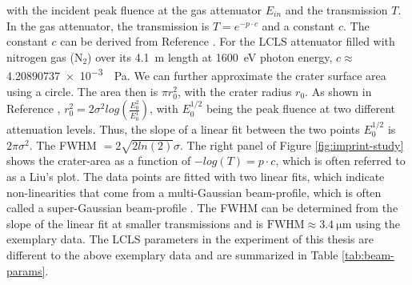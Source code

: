 with the incident peak fluence at the gas attenuator $E_{in}$ and the transmission $T$. In the gas attenuator, the transmission is $T=e^{-p \cdot c}$ and a constant $c$. The constant $c$ can be derived from Reference \citep{Henke-1993-ADNDT}. For the LCLS attenuator filled with nitrogen gas (N$_{2}$) over its \SI{4.1}{\meter} length at \SI{1600}{\electronvolt} photon energy, $c\approx$ \SI{4.20890737e-3}{\per\pascal}. We can further approximate the crater surface area using a circle. The area then is $\pi r_{0}^{2}$, with the crater radius $r_{0}$. As shown in Reference \citep{Liu-1982-OptLett}, $r_{0}^{2}=2\sigma^{2}log(\tfrac{E^{2}_{0}}{E_{0}^{1}})$, with $E_{0}^{1/2}$ being the peak fluence at two different attenuation levels. Thus, the slope of a linear fit between the two points $E_{0}^{1/2}$ is $2 \pi \sigma^{2}$. The FWHM $=2\sqrt{2 ln(2)}\sigma$. The right panel of Figure \ref{fig:imprint-study} shows the crater-area as a function of $-log(T)= p \cdot c$, which is often referred to as a Liu's plot. The data points are fitted with two linear fits, which indicate non-linearities that come from a multi-Gaussian beam-profile, which is often called a super-Gaussian beam-profile \citep{Chalupsky-2010-OE,Chalupsky-2013-OE}. The FWHM can be determined from the slope of the linear fit at smaller transmissions and is $\text{FWHM}\approx \SI{3.4}{\micro\meter}$ using the exemplary data. The LCLS parameters in the experiment of this thesis are different to the above exemplary data and are summarized in Table \ref{tab:beam-params}.
%
%
%